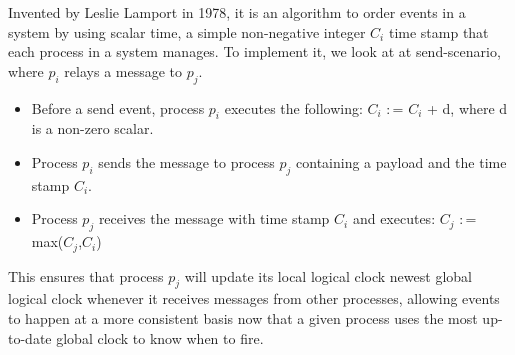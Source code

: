 Invented by Leslie Lamport in 1978, it is an algorithm to order events in a system by using scalar time, a simple non-negative integer $C_i$ time stamp that each process in a system manages. To implement it, we look at at send-scenario, where $p_i$ relays a message to $p_j$.

\begin{itemize}
	\item Before a send event, process $p_i$ executes the following: $C_i$ $\colon$=  $C_i$ + d, where d is a non-zero scalar.
	\item Process $p_i$ sends the message to process $p_j$ containing a payload and the time stamp $C_i$.
	\item Process $p_j$ receives the message with time stamp $C_i$ and executes: $C_j$ $\colon$= max($C_j$,$C_i$) 
\end{itemize}

\noindent This ensures that process $p_j$ will update its local logical clock newest global logical clock whenever it receives messages from other processes, allowing events to happen at a more consistent basis now that a given process uses the most up-to-date global clock to know when to fire.


